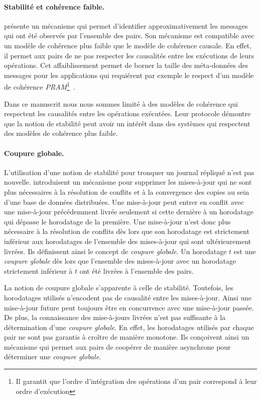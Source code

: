 \paragraph{Stabilité et cohérence faible.} \textcite{golding_1992_ackvector} présente un mécanisme qui permet d'identifier approximativement les messages qui ont été observés par l'ensemble des pairs.
Son mécanisme est compatible avec un modèle de cohérence plus faible que le modèle de cohérence causale.
En effet, il permet aux pairs de ne pas respecter les causalités entre les exécutions de leurs opérations.
Cet affaiblissement permet de borner la taille des méta-données des messages pour les applications qui requiérent par exemple le respect d'un modèle de cohérence \emph{PRAM}\footnote{Il garantit que l'ordre d'intégration des opérations d'un pair correspond à leur ordre d'exécution}~\autocite{viotti_consistency_2016}.

Dans ce manuscrit nous nous sommes limité à des modèles de cohérence qui respectent les causalités entre les opérations exécutées.
Leur protocole démontre que la notion de stabilité peut avoir un intérêt dans des systèmes qui respectent des modèles de cohérence plus faible.

\paragraph{Coupure globale.} L'utilisation d'une notion de stabilité pour tronquer un journal répliqué n'est pas nouvelle.
\textcite{sarin_1987_discarding} introduisent un mécanisme pour supprimer les mises-à-jour qui ne sont plus nécessaires à la résolution de conflits et à la convergence des copies au sein d'une base de données distribuées.
Une mise-à-jour peut entrer en conflit avec une mise-à-jour précédemment livrée seulement si cette dernière à un horodatage qui dépasse le horodatage de la première.
Une mise-à-jour n'est donc plus nécessaire à la résolution de conflits dès lors que son horodatage est strictement inférieur aux horodatages de l'ensemble des mises-à-jour
qui sont ultérieurement livrées.
Ils définissent ainsi le concept de \emph{coupure globale}.
Un horodatage $t$ est une \emph{coupure globale} dès lors que l'ensemble des mises-à-jour avec un horodatage strictement inférieur à $t$ ont été livrées à l'ensemble des pairs.

La notion de coupure globale s'apparente à celle de stabilité.
Toutefois, les horodatages utilisés n'encodent pas de causalité entre les mises-à-jour.
Ainsi une mise-à-jour future peut toujours être en concurrence avec une mise-à-jour passée.
De plus, la connaissance des mise-à-jours livrées n'est pas suffisante à la détermination d'une \emph{coupure globale}.
En effet, les horodatages utilisés par chaque pair ne sont pas garantis à croître de manière monotone.
Ils conçoivent ainsi un mécanisme qui permet aux pairs de coopérer de manière asynchrone pour déterminer une \emph{coupure globale}.

